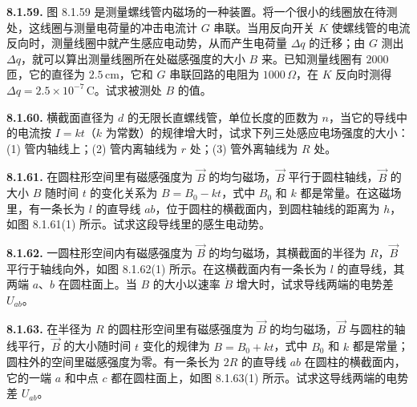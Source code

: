 \vfill
\newpage

\textbf{8.1.59.} 图 8.1.59 是测量螺线管内磁场的一种装置。将一个很小的线圈放在待测处，这线圈与测量电荷量的冲击电流计 $G$ 串联。当用反向开关 $K$ 使螺线管的电流反向时，测量线圈中就产生感应电动势，从而产生电荷量 $\Delta q$ 的迁移；由 $G$ 测出 $\Delta q$，就可以算出测量线圈所在处磁感强度的大小 $B$ 来。已知测量线圈有 $2000$ 匝，它的直径为 $2.5\,\mathrm{cm}$，它和 $G$ 串联回路的电阻为 $1000\,\Omega$，在 $K$ 反向时测得 $\Delta q = 2.5 \times 10^{-7}\,\mathrm{C}$。试求被测处 $B$ 的值。

\begin{center}
\end{center}

\vfill
\newpage

\textbf{8.1.60.} 横截面直径为 $d$ 的无限长直螺线管，单位长度的匝数为 $n$，当它的导线中的电流按 $I = kt$（$k$ 为常数）的规律增大时，试求下列三处感应电场强度的大小：(1) 管内轴线上；(2) 管内离轴线为 $r$ 处；(3) 管外离轴线为 $R$ 处。

\vfill
\newpage

\textbf{8.1.61.} 在圆柱形空间里有磁感强度为 $\vec{B}$ 的均匀磁场，$\vec{B}$ 平行于圆柱轴线，$\vec{B}$ 的大小 $B$ 随时间 $t$ 的变化关系为 $B = B_{0} - kt$，式中 $B_{0}$ 和 $k$ 都是常量。在这磁场里，有一条长为 $l$ 的直导线 $ab$，位于圆柱的横截面内，到圆柱轴线的距离为 $h$，如图 8.1.61(1) 所示。试求这段导线里的感生电动势。

\begin{center}
\end{center}

\vfill
\newpage

\textbf{8.1.62.} 一圆柱形空间内有磁感强度为 $\vec{B}$ 的均匀磁场，其横截面的半径为 $R$，$\vec{B}$ 平行于轴线向外，如图 8.1.62(1) 所示。在这横截面内有一条长为 $l$ 的直导线，其两端 $a$、$b$ 在圆柱面上。当 $B$ 的大小以速率 $\dot{B}$ 增大时，试求导线两端的电势差 $U_{ab}$。

\begin{center}
\end{center}

\vfill
\newpage

\textbf{8.1.63.} 在半径为 $R$ 的圆柱形空间里有磁感强度为 $\vec{B}$ 的均匀磁场，$\vec{B}$ 与圆柱的轴线平行，$\vec{B}$ 的大小随时间 $t$ 变化的规律为 $B = B_0 + kt$，式中 $B_0$ 和 $k$ 都是常量；圆柱外的空间里磁感强度为零。有一条长为 $2R$ 的直导线 $ab$ 在圆柱的横截面内，它的一端 $a$ 和中点 $c$ 都在圆柱面上，如图 8.1.63(1) 所示。试求这导线两端的电势差 $U_{ab}$。

